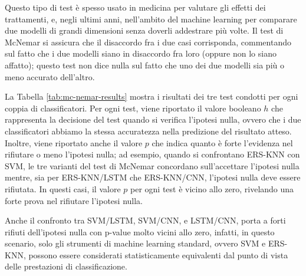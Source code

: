 Questo tipo di test è spesso usato in medicina per valutare gli effetti dei trattamenti, e, negli ultimi anni, nell'ambito del machine learning per comparare due modelli di grandi dimensioni senza doverli addestrare più volte. Il test di McNemar si assicura che il disaccordo fra i due casi corrisponda, commentando sul fatto che i due modelli siano in disaccordo fra loro (oppure non lo siano affatto); questo test non dice nulla sul fatto che uno dei due modelli sia più o meno accurato dell'altro.

La Tabella \ref{tab:mc-nemar-results} mostra i risultati dei tre test condotti per ogni coppia di classificatori.
Per ogni test, viene riportato il valore booleano $h$ che rappresenta la decisione del test quando si verifica l'ipotesi nulla, ovvero che i due classificatori abbiamo la stessa accuratezza nella predizione del risultato atteso.
Inoltre, viene riportato anche il valore $p$ che indica quanto è forte l'evidenza nel rifiutare o meno l'ipotesi nulla; ad esempio, quando si confrontano ERS-KNN con SVM, le tre varianti del test di McNemar concordano sull'accettare l'ipotesi nulla mentre, sia per ERS-KNN/LSTM che ERS-KNN/CNN, l'ipotesi nulla deve essere rifiutata. In questi casi, il valore $p$ per ogni test è vicino allo zero, rivelando una forte prova nel rifiutare l'ipotesi nulla.

Anche il confronto tra SVM/LSTM, SVM/CNN, e LSTM/CNN, porta a forti rifiuti dell'ipotesi nulla con p-value molto vicini allo zero, infatti, in questo scenario, solo gli strumenti di machine learning standard, ovvero SVM e ERS-KNN, possono essere considerati statisticamente equivalenti dal punto di vista delle prestazioni di classificazione.

